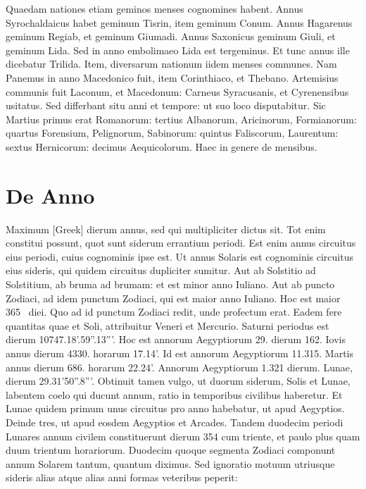 Quaedam nationes etiam geminos menses cognomines habent.
Annus Syrochaldaicus habet geminum Tisrin, item geminum Conum.
Annus Hagarenus geminum Regiab, et geminum Giumadi.
Annus Saxonicus geminum Giuli, et geminum Lida.
Sed in
anno embolimaeo Lida est tergeminus.
Et tunc annus ille dicebatur
Trilida.
Item, diversarum nationum iidem menses communes.
Nam
Panemus in anno Macedonico fuit, item Corinthiaco, et Thebano.
Artemisius communis fuit Laconum, et Macedonum: Carneus Syracusanis,
et Cyrenensibus usitatus.
Sed differbant situ anni et tempore:
ut suo loco disputabitur.
Sic Martius primus erat Romanorum:
tertius Albanorum, Aricinorum, Formianorum: quartus Forensium,
Pelignorum, Sabinorum: quintus Faliscorum, Laurentum:
sextus Hernicorum: decimus Aequicolorum.
Haec in genere
de mensibus.

\section{De Anno}

Maximum \textgreek{[Greek]}
 dierum annus, sed qui multipliciter dictus
sit.
Tot enim constitui possunt, quot sunt siderum errantium
periodi.
Est enim annus circuitus eius periodi, cuius cognominis
ipse est.
Ut annus Solaris est cognominis circuitus eius sideris,
qui quidem circuitus dupliciter sumitur.
Aut ab Solstitio ad Solstitium,
ab bruma ad brumam: et est minor anno Iuliano.
Aut ab puncto Zodiaci,
ad idem punctum Zodiaci, qui est maior anno Iuliano.
Hoc est maior 365~ diei.
Quo ad id punctum Zodiaci redit, unde profectum
erat.
Eadem fere quantitas quae et Soli, attribuitur Veneri et Mercurio.
Saturni periodus est dierum 10747.18'.59''.13'''.
Hoc est annorum
Aegyptiorum 29. dierum 162.
Iovis annus dierum 4330. horarum 17.14'.
Id est annorum Aegyptiorum 11.315.
Martis annus dierum
686. horarum 22.24'.
Annorum Aegyptiorum 1.321 dierum.
Lunae,
dierum 29.31'50''.8'''.
Obtinuit tamen vulgo, ut duorum siderum,
Solis et Lunae, labentem coelo qui ducunt annum, ratio in temporibus
civilibus haberetur.
Et Lunae quidem primum unus circuitus
pro anno habebatur, ut apud Aegyptios.
Deinde tres, ut apud eosdem
Aegyptios et Arcades.
Tandem duodecim periodi Lunares annum
civilem constituerunt dierum 354 cum triente, et paulo plus quam
duum trientum horariorum.
Duodecim quoque segmenta Zodiaci
componunt annum Solarem tantum, quantum diximus.
Sed ignoratio
motuum utriusque sideris alias atque alias anni formas veteribus
peperit:

